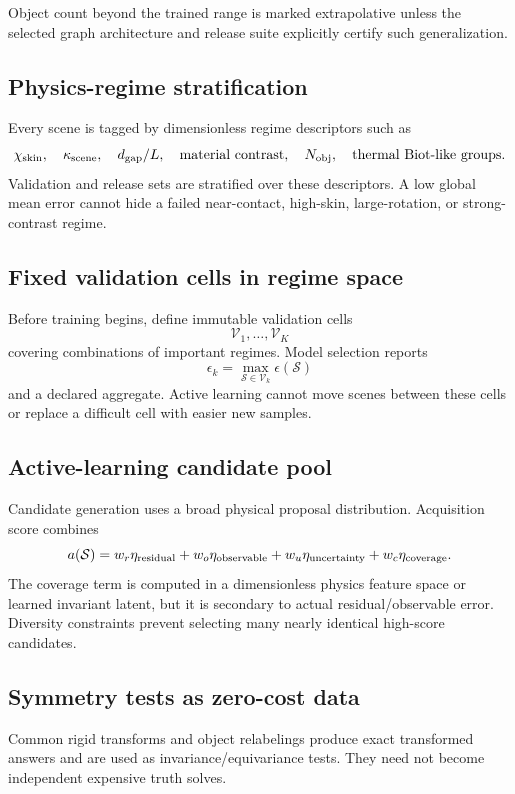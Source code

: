 Object count beyond the trained range is marked extrapolative unless the
selected graph architecture and release suite explicitly certify such
generalization.

\subsection{Physics-regime stratification}

Every scene is tagged by dimensionless regime descriptors such as
\[
 \chi_{\rm skin},\quad
 \kappa_{\rm scene},\quad
 d_{\rm gap}/L,\quad
 \text{material contrast},\quad
 N_{\rm obj},\quad
 \text{thermal Biot-like groups}.
\]
Validation and release sets are stratified over these descriptors. A low global
mean error cannot hide a failed near-contact, high-skin, large-rotation, or
strong-contrast regime.

\subsection{Fixed validation cells in regime space}

Before training begins, define immutable validation cells
\[
  \mathcal V_1,\ldots,\mathcal V_K
\]
covering combinations of important regimes. Model selection reports
\[
  \epsilon_k
  =
  \max_{\mathcal S\in\mathcal V_k}
  \epsilon(\mathcal S)
\]
and a declared aggregate. Active learning cannot move scenes between these
cells or replace a difficult cell with easier new samples.

\subsection{Active-learning candidate pool}

Candidate generation uses a broad physical proposal distribution. Acquisition
score combines
\[
 a(\mathcal S)
 =
 w_r\eta_{\rm residual}
 +w_o\eta_{\rm observable}
 +w_u\eta_{\rm uncertainty}
 +w_c\eta_{\rm coverage}.
\]
The coverage term is computed in a dimensionless physics feature space or
learned invariant latent, but it is secondary to actual residual/observable
error. Diversity constraints prevent selecting many nearly identical high-score
candidates.

\subsection{Symmetry tests as zero-cost data}

Common rigid transforms and object relabelings produce exact transformed
answers and are used as invariance/equivariance tests. They need not become
independent expensive truth solves.

